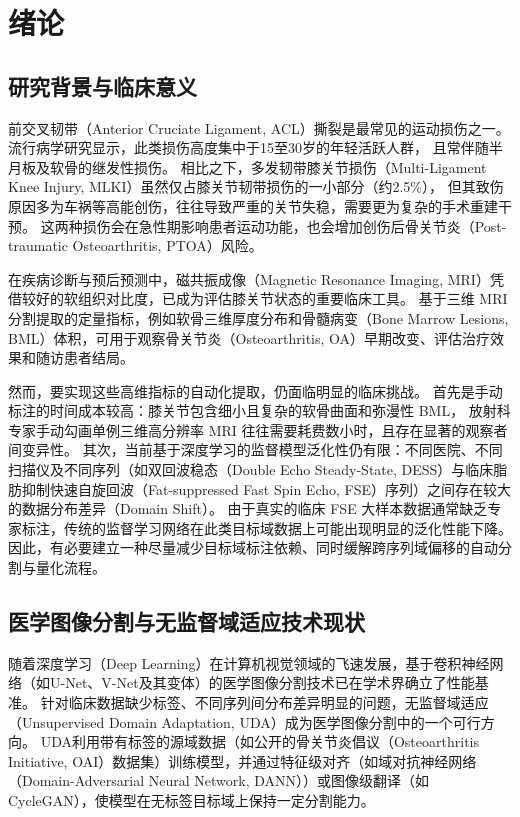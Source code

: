 
\chapter{绪论}

\section{研究背景与临床意义}
  前交叉韧带（Anterior Cruciate Ligament, ACL）撕裂是最常见的运动损伤之一。
  流行病学研究显示，此类损伤高度集中于15至30岁的年轻活跃人群\cite{sandersIncidenceAnteriorCruciate2016}，
  且常伴随半月板及软骨的继发性损伤\cite{spindlerClinicalPracticeAnterior2008}。
  相比之下，多发韧带膝关节损伤（Multi-Ligament Knee Injury, MLKI）虽然仅占膝关节韧带损伤的一小部分（约2.5\%）\cite{wilsonEpidemiologyMultiligamentKnee2014}，
  但其致伤原因多为车祸等高能创伤，往往导致严重的关节失稳，需要更为复杂的手术重建干预\cite{moatsheDiagnosisTreatmentMultiligament2017}。
  这两种损伤会在急性期影响患者运动功能，也会增加创伤后骨关节炎（Post-traumatic Osteoarthritis, PTOA）风险\cite{lohmanderLongtermConsequenceAnterior2007, snoekerRiskKneeOsteoarthritis2020}。
  \par 在疾病诊断与预后预测中，磁共振成像（Magnetic Resonance Imaging, MRI）凭借较好的软组织对比度，已成为评估膝关节状态的重要临床工具。
  基于三维 MRI 分割提取的定量指标，例如软骨三维厚度分布\cite{ecksteinMagneticResonanceImaging2006}和骨髓病变（Bone Marrow Lesions, BML）体积\cite{felsonAssociationBoneMarrow2001}，可用于观察骨关节炎（Osteoarthritis, OA）早期改变、评估治疗效果和随访患者结局。
  \par 然而，要实现这些高维指标的自动化提取，仍面临明显的临床挑战。
  首先是手动标注的时间成本较高：膝关节包含细小且复杂的软骨曲面和弥漫性 BML，
  放射科专家手动勾画单例三维高分辨率 MRI 往往需要耗费数小时，且存在显著的观察者间变异性。
  其次，当前基于深度学习的监督模型泛化性仍有限：不同医院、不同扫描仪及不同序列（如双回波稳态（Double Echo Steady-State, DESS）与临床脂肪抑制快速自旋回波（Fat-suppressed Fast Spin Echo, FSE）序列）之间存在较大的数据分布差异（Domain Shift）。
  由于真实的临床 FSE 大样本数据通常缺乏专家标注，传统的监督学习网络在此类目标域数据上可能出现明显的泛化性能下降。
  因此，有必要建立一种尽量减少目标域标注依赖、同时缓解跨序列域偏移的自动分割与量化流程。

\section{医学图像分割与无监督域适应技术现状}
  随着深度学习（Deep Learning）在计算机视觉领域的飞速发展，基于卷积神经网络（如U-Net、V-Net及其变体）的医学图像分割技术已在学术界确立了性能基准。
  针对临床数据缺少标签、不同序列间分布差异明显的问题，无监督域适应（Unsupervised Domain Adaptation, UDA）成为医学图像分割中的一个可行方向。
  UDA利用带有标签的源域数据（如公开的骨关节炎倡议（Osteoarthritis Initiative, OAI）数据集）训练模型，并通过特征级对齐（如域对抗神经网络（Domain-Adversarial Neural Network, DANN））或图像级翻译（如CycleGAN），使模型在无标签目标域上保持一定分割能力。

